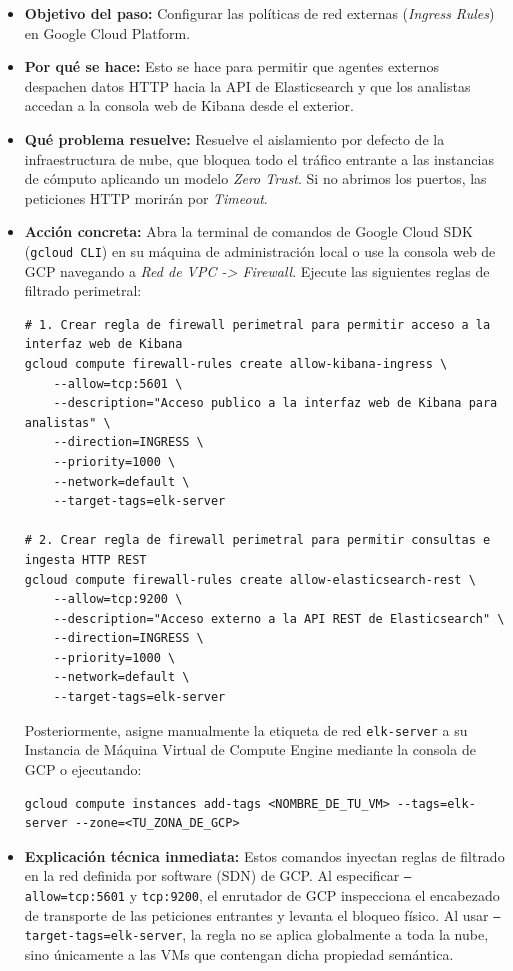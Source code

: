 \documentclass[
  coursetitle={Cómputo Nube y Tecnologías Emergentes},
  coursehours={96},
  coursedate={Verano 2026},
  doctype={Guía de Laboratorio Práctico},
  otherlangs={english,french},
  authorname={Lázaro},
  authorsurname={Bustio-Martínez},
  authortitle={PhD},
  role={Profesor Investigador},
  email={lbustio@inaoe.mx},
  phone={5559504000},
  ext={7459},
  institution={Instituto Nacional de Astrofísica, Óptica y Electrónica (INAOE)},
  department={Maestría en Ciencias en Tecnologías de Seguridad},
  address={Luis Enrique Erro 1, Sta. Ma. Tonantzintla, San Andrés Cholula, CP 72840, Puebla, México},
  margin={0.5in}
]{../../lbustio_lecture_notes}
\begin{document}
\begin{itemize}
    \item \textbf{Objetivo del paso:} Configurar las políticas de red externas (\textit{Ingress Rules}) en Google Cloud Platform.
    \item \textbf{Por qué se hace:} Esto se hace para permitir que agentes externos despachen datos HTTP hacia la API de Elasticsearch y que los analistas accedan a la consola web de Kibana desde el exterior.
    \item \textbf{Qué problema resuelve:} Resuelve el aislamiento por defecto de la infraestructura de nube, que bloquea todo el tráfico entrante a las instancias de cómputo aplicando un modelo \textit{Zero Trust}. Si no abrimos los puertos, las peticiones HTTP morirán por \textit{Timeout}.
    \item \textbf{Acción concreta:} Abra la terminal de comandos de Google Cloud SDK (\texttt{gcloud CLI}) en su máquina de administración local o use la consola web de GCP navegando a \textit{Red de VPC -> Firewall}. Ejecute las siguientes reglas de filtrado perimetral:
    
\begin{verbatim}
# 1. Crear regla de firewall perimetral para permitir acceso a la interfaz web de Kibana
gcloud compute firewall-rules create allow-kibana-ingress \
    --allow=tcp:5601 \
    --description="Acceso publico a la interfaz web de Kibana para analistas" \
    --direction=INGRESS \
    --priority=1000 \
    --network=default \
    --target-tags=elk-server

# 2. Crear regla de firewall perimetral para permitir consultas e ingesta HTTP REST
gcloud compute firewall-rules create allow-elasticsearch-rest \
    --allow=tcp:9200 \
    --description="Acceso externo a la API REST de Elasticsearch" \
    --direction=INGRESS \
    --priority=1000 \
    --network=default \
    --target-tags=elk-server
\end{verbatim}

    Posteriormente, asigne manualmente la etiqueta de red \texttt{elk-server} a su Instancia de Máquina Virtual de Compute Engine mediante la consola de GCP o ejecutando:
    
\begin{verbatim}
gcloud compute instances add-tags <NOMBRE_DE_TU_VM> --tags=elk-server --zone=<TU_ZONA_DE_GCP>
\end{verbatim}

    \item \textbf{Explicación técnica inmediata:} Estos comandos inyectan reglas de filtrado en la red definida por software (SDN) de GCP. Al especificar \texttt{--allow=tcp:5601} y \texttt{tcp:9200}, el enrutador de GCP inspecciona el encabezado de transporte de las peticiones entrantes y levanta el bloqueo físico. Al usar \texttt{--target-tags=elk-server}, la regla no se aplica globalmente a toda la nube, sino únicamente a las VMs que contengan dicha propiedad semántica.
    

\end{itemize}
\end{document}
